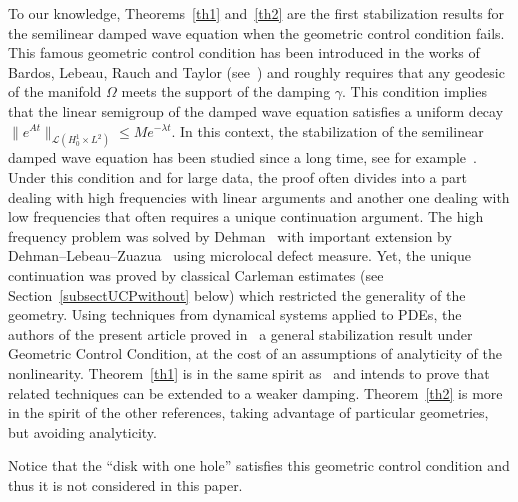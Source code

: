 \documentclass[10pt]{amsart}
\theoremstyle{definition}\newtheorem{defi}[theo]{Definition}\newtheorem{rema}[theo]{Remark}\newtheorem{exam}[theo]{Example}\newtheorem{exem}[theo]{Example}\newtheorem{nota}[theo]{Notation}
\newcommand{\Lc}{\mathcal{L}}
\begin{document}


To our knowledge, Theorems~\ref{th1} and~\ref{th2} are the first stabilization results for the semilinear damped wave equation when the geometric control condition fails. This famous geometric control condition has been introduced in the works of Bardos, Lebeau, Rauch and Taylor (see~\cite{BLR}) and roughly requires that any geodesic of the manifold $\Omega$ meets the support of the damping $\gamma$. This condition implies that the linear semigroup of the damped wave equation satisfies a uniform decay $\|e^{At}\|_{\Lc(H^1_0\times L^2)}\leq Me^{-\lambda t}$. In this context, the stabilization of the semilinear damped wave equation has been studied since a long time, see for example~\cite{Dehman,DLZ,Haraux,RC, Zuazua}. Under this condition and for large data, the proof often divides into a part dealing with high frequencies with linear arguments and another one dealing with low frequencies that often requires a unique continuation argument. The high frequency problem was solved by Dehman~\cite{Dehman} with important extension by Dehman--Lebeau--Zuazua~\cite{DLZ} using microlocal defect measure. Yet, the unique continuation was proved by classical Carleman estimates (see Section~\ref{subsectUCPwithout} below) which restricted the generality of the geometry. Using techniques from dynamical systems applied to PDEs, the authors of the present article proved in~\cite{RC} a general stabilization result under Geometric Control Condition, at the cost of an assumptions of analyticity of the nonlinearity. Theorem~\ref{th1} is in the same spirit as~\cite{RC} and intends to prove that related techniques can be extended to a weaker damping. Theorem~\ref{th2} is more in the spirit of the other references, taking advantage of particular geometries, but avoiding analyticity.


Notice that the ``disk with one hole'' satisfies this geometric control condition and thus it is not considered in this paper.
\end{document}
